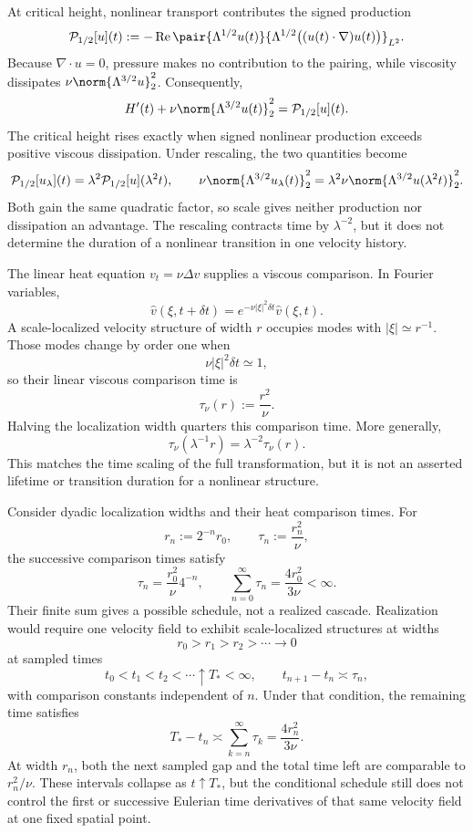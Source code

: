
At critical height, nonlinear transport contributes the signed production
\[
  \mathcal P_{1/2}[u](t)
  :=
  -\operatorname{Re}
  \pair
    {\Lambda^{1/2}u(t)}
    {\Lambda^{1/2}\bigl((u(t)\cdot\nabla)u(t)\bigr)}_{L^2}.
\]
Because \(\nabla\cdot u=0\), pressure makes no contribution to the pairing, while viscosity dissipates \(\nu\norm{\Lambda^{3/2}u}_2^2\). Consequently,
\[
  H'(t)
  +
  \nu\norm{\Lambda^{3/2}u(t)}_2^2
  =
  \mathcal P_{1/2}[u](t).
\]
The critical height rises exactly when signed nonlinear production exceeds positive viscous dissipation. Under rescaling, the two quantities become
\[
  \mathcal P_{1/2}[u_\lambda](t)
  =
  \lambda^2\mathcal P_{1/2}[u](\lambda^2t),
  \qquad
  \nu\norm{\Lambda^{3/2}u_\lambda(t)}_2^2
  =
  \lambda^2\nu\norm{\Lambda^{3/2}u(\lambda^2t)}_2^2.
\]
Both gain the same quadratic factor, so scale gives neither production nor dissipation an advantage. The rescaling contracts time by \(\lambda^{-2}\), but it does not determine the duration of a nonlinear transition in one velocity history.


The linear heat equation \(v_t=\nu\Delta v\) supplies a viscous comparison. In Fourier variables,
\[
  \widehat v(\xi,t+\delta t)
  =
  e^{-\nu|\xi|^2\delta t}\widehat v(\xi,t).
\]
A scale-localized velocity structure of width \(r\) occupies modes with \(|\xi|\simeq r^{-1}\). Those modes change by order one when
\[
  \nu|\xi|^2\delta t\simeq1,
\]
so their linear viscous comparison time is
\[
  \tau_\nu(r)
  :=
  \frac{r^2}{\nu}.
\]
Halving the localization width quarters this comparison time. More generally,
\[
  \tau_\nu(\lambda^{-1}r)
  =
  \lambda^{-2}\tau_\nu(r).
\]
This matches the time scaling of the full \NavierStokes{} transformation, but it is not an asserted lifetime or transition duration for a nonlinear structure.


Consider dyadic localization widths and their heat comparison times. For
\[
  r_n:=2^{-n}r_0,
  \qquad
  \tau_n:=\frac{r_n^2}{\nu},
\]
the successive comparison times satisfy
\[
  \tau_n
  =
  \frac{r_0^2}{\nu}4^{-n},
  \qquad
  \sum_{n=0}^{\infty}\tau_n
  =
  \frac{4r_0^2}{3\nu}
  <
  \infty.
\]
Their finite sum gives a possible schedule, not a realized cascade. Realization would require one \NavierStokes{} velocity field to exhibit scale-localized structures at widths
\[
  r_0>r_1>r_2>\cdots\longrightarrow0
\]
at sampled times
\[
  t_0<t_1<t_2<\cdots\uparrow T_*<\infty,
  \qquad
  t_{n+1}-t_n\asymp\tau_n,
\]
with comparison constants independent of \(n\). Under that condition, the remaining time satisfies
\[
  T_*-t_n
  \asymp
  \sum_{k=n}^{\infty}\tau_k
  =
  \frac{4r_n^2}{3\nu}.
\]
At width \(r_n\), both the next sampled gap and the total time left are comparable to \(r_n^2/\nu\). These intervals collapse as \(t\uparrow T_*\), but the conditional schedule still does not control the first or successive Eulerian time derivatives of that same velocity field at one fixed spatial point.
